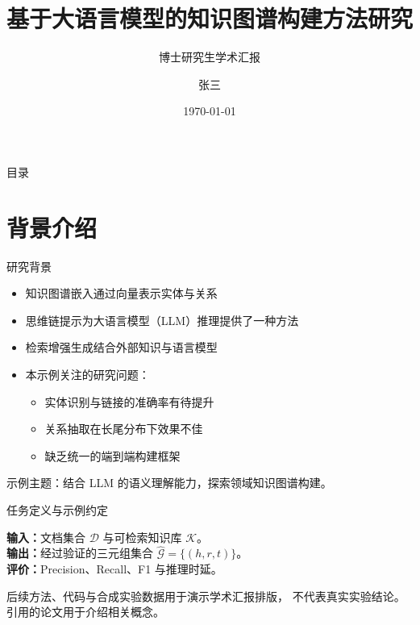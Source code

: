 \documentclass[aspectratio=169, UTF8]{ctexbeamer}
\title[学术汇报简称]{基于大语言模型的知识图谱构建方法研究}
\subtitle{博士研究生学术汇报}
\author[张三]{张\;三}
\institute[南开大学]{南开大学\quad 计算机学院}
\date{\today}
\begin{document}

\begin{frame}
  \titlepage
\end{frame}

\begin{frame}{目录}
  \tableofcontents
\end{frame}

\section{背景介绍}

\begin{frame}{研究背景}
  \begin{itemize}
    \item 知识图谱嵌入通过向量表示实体与关系
    \item 思维链提示为大语言模型（LLM）推理提供了一种方法
    \item 检索增强生成结合外部知识与语言模型
    \item 本示例关注的研究问题：
    \begin{itemize}
      \item 实体识别与链接的准确率有待提升
      \item 关系抽取在长尾分布下效果不佳
      \item 缺乏统一的端到端构建框架
    \end{itemize}
  \end{itemize}

  \vspace{0.5em}
  \begin{nkremark}[title={}]
    示例主题：结合 LLM 的语义理解能力，探索领域知识图谱构建。
  \end{nkremark}
\end{frame}

\begin{frame}{任务定义与示例约定}
  \begin{nkbox}[title={从文档到知识三元组}]
    \textbf{输入：}文档集合 $\mathcal{D}$ 与可检索知识库 $\mathcal{K}$。\\[0.3em]
    \textbf{输出：}经过验证的三元组集合
    $\widehat{\mathcal{G}} = \{(h,r,t)\}$。\\[0.3em]
    \textbf{评价：}Precision、Recall、F1 与推理时延。
  \end{nkbox}
  \begin{nkremark}[title={如何阅读本示例}]
    后续方法、代码与\alert{合成实验数据}用于演示学术汇报排版，
    不代表真实实验结论。引用的论文用于介绍相关概念。
  \end{nkremark}
\end{frame}
\end{document}
